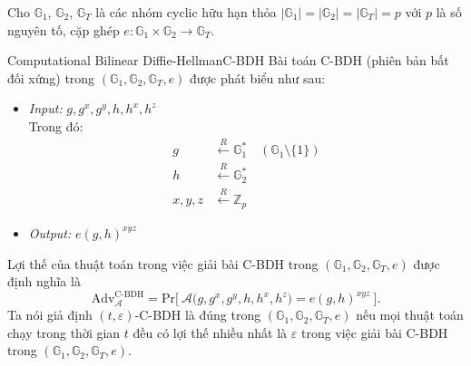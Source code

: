 \documentclass[class=report, crop=false]{standalone}
\begin{document}
		Cho $\mathbb{G}_1$, $\mathbb{G}_2$, $\mathbb{G}_T$ là các nhóm cyclic hữu hạn thỏa $|\mathbb{G}_1| = |\mathbb{G}_2| = |\mathbb{G}_T| = p$ với $p$ là số nguyên tố, cặp ghép $e: \mathbb{G}_1 \times \mathbb{G}_2 \rightarrow \mathbb{G}_T$.
		\newpage
		\begin{problem}{Computational Bilinear Diffie-Hellman}{C-BDH}
			Bài toán C-BDH (phiên bản bất đối xứng) trong $(\mathbb{G}_1, \mathbb{G}_2, \mathbb{G}_T, e)$ được phát biểu như sau:
			\vspace{-\baselineskip}
			\begin{itemize}[leftmargin=1.5cm, itemindent=-0.5cm]
				\item[] \textit{Input:} $g, g^x, g^y, h, h^x, h^z$ \\
				Trong đó: \vspace{-\baselineskip}
				\begin{align*}
					g 			&\xleftarrow{R} \mathbb{G}_1^* \quad (\mathbb{G}_1 \setminus \{1\}) \\
					h 			&\xleftarrow{R} \mathbb{G}_2^* 										\\
					x, y, z 	&\xleftarrow{R} \mathbb{Z}_p
				\end{align*}
				\item[] \textit{Output:} $e(g, h)^{xyz}$
			\end{itemize}
			\vspace{-\baselineskip}\par
			Lợi thế của thuật toán \algo trong việc giải bài C-BDH trong $(\mathbb{G}_1, \mathbb{G}_2, \mathbb{G}_T, e)$ được định nghĩa là
			\[
				\text{Adv}_{\mathcal{A}}^{\text{C-BDH}} = \text{Pr}\bigg[ \ \mathcal{A}\Big(g, g^x, g^y, h, h^x, h^z \Big) = e(g, h)^{xyz} \ \bigg].
			\] \indent
			Ta nói giả định $(t, \varepsilon)$-C-BDH là đúng trong $(\mathbb{G}_1, \mathbb{G}_2, \mathbb{G}_T, e)$ nếu mọi thuật toán chạy trong thời gian $t$ đều có lợi thế nhiều nhất là $\varepsilon$ trong việc giải bài C-BDH trong $(\mathbb{G}_1, \mathbb{G}_2, \mathbb{G}_T, e)$.
		\end{problem}
\end{document}
